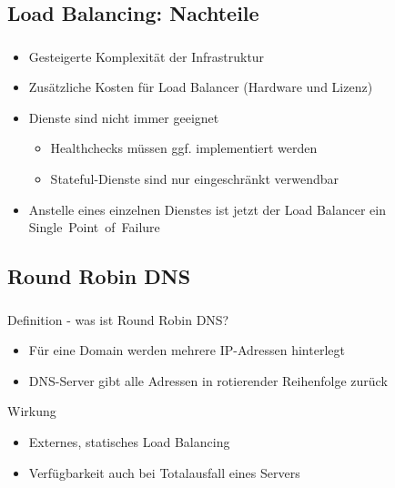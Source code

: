 \subsection{Load Balancing: Nachteile}
\begin{frame}
    \frametitle{\insertsection}
    \framesubtitle{\insertsubsection}

    \begin{itemize}
    	\item Gesteigerte Komplexität der Infrastruktur
    	\item Zusätzliche Kosten für Load Balancer (Hardware und Lizenz)%
    	\item Dienste sind nicht immer geeignet
		\begin{itemize}
			\item Healthchecks müssen ggf. implementiert werden
			\item Stateful-Dienste sind nur eingeschränkt verwendbar
		\end{itemize}
    	\item Anstelle eines einzelnen Dienstes ist jetzt der Load Balancer ein Single~Point~of~Failure
    \end{itemize}
\end{frame}



\subsection{Round Robin DNS}
\begin{frame}
    \frametitle{\insertsection}
    \framesubtitle{\insertsubsection}
    \begin{block}{Definition - was ist Round Robin DNS?}
    \begin{itemize}
        \item Für eine Domain werden mehrere IP-Adressen hinterlegt
        \item DNS-Server gibt alle Adressen in rotierender Reihenfolge zurück


    \end{itemize}
    \end{block}
    \begin{block}{Wirkung}
    	\begin{itemize}
    		\item Externes, statisches Load Balancing
    		\item Verfügbarkeit auch bei Totalausfall eines Servers
    	\end{itemize}
    \end{block}
\end{frame}

